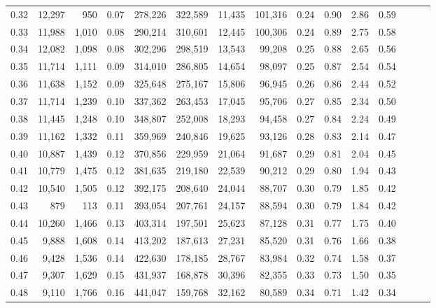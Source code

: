\begin{tabular}{rrrrrrrrrrrrrrr}
0.32 &  12,297 &    950 &  0.07 &  278,226 &  322,589 &   11,435 &  101,316 &  0.24 &  0.90 &  2.86 &      0.59 \\
0.33 &  11,988 &  1,010 &  0.08 &  290,214 &  310,601 &   12,445 &  100,306 &  0.24 &  0.89 &  2.75 &      0.58 \\
0.34 &  12,082 &  1,098 &  0.08 &  302,296 &  298,519 &   13,543 &   99,208 &  0.25 &  0.88 &  2.65 &      0.56 \\
0.35 &  11,714 &  1,111 &  0.09 &  314,010 &  286,805 &   14,654 &   98,097 &  0.25 &  0.87 &  2.54 &      0.54 \\
0.36 &  11,638 &  1,152 &  0.09 &  325,648 &  275,167 &   15,806 &   96,945 &  0.26 &  0.86 &  2.44 &      0.52 \\
0.37 &  11,714 &  1,239 &  0.10 &  337,362 &  263,453 &   17,045 &   95,706 &  0.27 &  0.85 &  2.34 &      0.50 \\
0.38 &  11,445 &  1,248 &  0.10 &  348,807 &  252,008 &   18,293 &   94,458 &  0.27 &  0.84 &  2.24 &      0.49 \\
0.39 &  11,162 &  1,332 &  0.11 &  359,969 &  240,846 &   19,625 &   93,126 &  0.28 &  0.83 &  2.14 &      0.47 \\
0.40 &  10,887 &  1,439 &  0.12 &  370,856 &  229,959 &   21,064 &   91,687 &  0.29 &  0.81 &  2.04 &      0.45 \\
0.41 &  10,779 &  1,475 &  0.12 &  381,635 &  219,180 &   22,539 &   90,212 &  0.29 &  0.80 &  1.94 &      0.43 \\
0.42 &  10,540 &  1,505 &  0.12 &  392,175 &  208,640 &   24,044 &   88,707 &  0.30 &  0.79 &  1.85 &      0.42 \\
0.43 &     879 &    113 &  0.11 &  393,054 &  207,761 &   24,157 &   88,594 &  0.30 &  0.79 &  1.84 &      0.42 \\
0.44 &  10,260 &  1,466 &  0.13 &  403,314 &  197,501 &   25,623 &   87,128 &  0.31 &  0.77 &  1.75 &      0.40 \\
0.45 &   9,888 &  1,608 &  0.14 &  413,202 &  187,613 &   27,231 &   85,520 &  0.31 &  0.76 &  1.66 &      0.38 \\
0.46 &   9,428 &  1,536 &  0.14 &  422,630 &  178,185 &   28,767 &   83,984 &  0.32 &  0.74 &  1.58 &      0.37 \\
0.47 &   9,307 &  1,629 &  0.15 &  431,937 &  168,878 &   30,396 &   82,355 &  0.33 &  0.73 &  1.50 &      0.35 \\
0.48 &   9,110 &  1,766 &  0.16 &  441,047 &  159,768 &   32,162 &   80,589 &  0.34 &  0.71 &  1.42 &      0.34 \\

\end{tabular}
